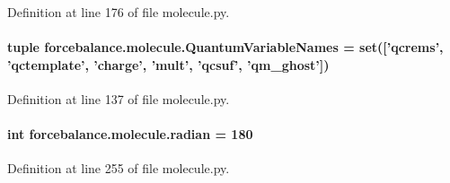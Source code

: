 Definition at line 176 of file molecule.\-py.

\hypertarget{namespaceforcebalance_1_1molecule_ab67efeab6049ec1f416b9ad1eed6ffcc}{
\paragraph[{Quantum\-Variable\-Names}]{\setlength{\rightskip}{0pt plus 5cm}tuple forcebalance.\-molecule.\-Quantum\-Variable\-Names = set(\mbox{[}'qcrems', 'qctemplate', 'charge', 'mult', 'qcsuf', 'qm\-\_\-ghost'\mbox{]})}}\label{namespaceforcebalance_1_1molecule_ab67efeab6049ec1f416b9ad1eed6ffcc}


Definition at line 137 of file molecule.\-py.

\hypertarget{namespaceforcebalance_1_1molecule_a1ee5389ce8a9042e053c7972dbbfb005}{
\paragraph[{radian}]{\setlength{\rightskip}{0pt plus 5cm}int forcebalance.\-molecule.\-radian = 180}}\label{namespaceforcebalance_1_1molecule_a1ee5389ce8a9042e053c7972dbbfb005}


Definition at line 255 of file molecule.\-py.

